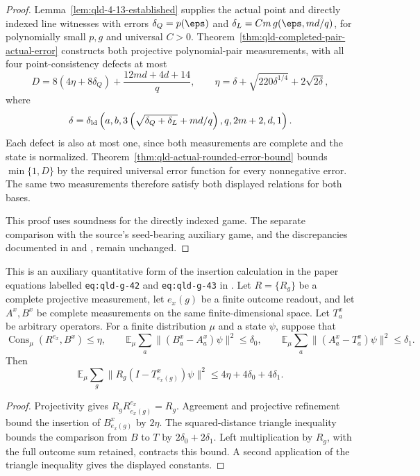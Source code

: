 \begin{proof}
\leanok
{}
Lemma~\ref{lem:qld-4-13-established} supplies the actual point and directly
indexed line witnesses with errors $\delta_Q=p(\eps)$ and
$\delta_L=Cm\,g(\eps,md/q)$, for polynomially small $p,g$ and universal $C>0$.
Theorem~\ref{thm:qld-completed-pair-actual-error} constructs both projective
polynomial-pair measurements, with all four point-consistency defects at most
\[
 D=8(4\eta+8\delta_Q)+\frac{12md+4d+14}{q},\qquad
 \eta=\delta+\sqrt{220\delta^{1/4}}+2\sqrt{2\delta},
\]
where
\[
 \delta=\delta_{\rm ld}\left(a,b,
 3\left(\sqrt{\delta_Q+\delta_L}+md/q\right),q,2m+2,d,1\right).
\]
Each defect is also at most one, since both measurements are complete and
the state is normalized. Theorem~\ref{thm:qld-actual-rounded-error-bound}
bounds $\min\{1,D\}$ by the required universal error function for every
nonnegative error. The same two measurements therefore satisfy both
displayed relations for both bases.

This proof uses soundness for the directly indexed game. The separate
comparison with the source's seed-bearing auxiliary game, and the
discrepancies documented in \cite{gap:qpbt_ld-dimension-divisibility} and
\cite{gap:qpbt_combined-lines-error-term}, remain unchanged.
\end{proof}

\begin{lemma}
\label{lem:qld-projective-refinement-ordered}
\leanok
This is an auxiliary quantitative form of the insertion calculation in the
paper equations labelled \texttt{eq:qld-g-42} and \texttt{eq:qld-g-43}
in \cite{Ji2020MIPStar}. Let $R=\{R_g\}$ be a
complete projective measurement, let $e_x(g)$ be a finite outcome readout,
and let $A^x,B^x$ be complete measurements on the same finite-dimensional
space. Let $T^x_a$ be arbitrary operators. For a finite distribution $\mu$
and a state $\psi$, suppose that
\[
 \operatorname{Cons}_\mu(R^{e_x},B^x)\leq\eta,\qquad
 \mathbb E_\mu\sum_a\|(B^x_a-A^x_a)\psi\|^2\leq\delta_0,\qquad
 \mathbb E_\mu\sum_a\|(A^x_a-T^x_a)\psi\|^2\leq\delta_1.
\]
Then
\[
 \mathbb E_\mu\sum_g\|R_g(I-T^x_{e_x(g)})\psi\|^2
 \leq 4\eta+4\delta_0+4\delta_1.
\]
\end{lemma}
\begin{proof}
\leanok
{}
Projectivity gives $R_gR^{e_x}_{e_x(g)}=R_g$. Agreement and projective
refinement bound the insertion of $B^x_{e_x(g)}$ by $2\eta$.
The squared-distance triangle inequality bounds the comparison from $B$
to $T$ by $2\delta_0+2\delta_1$. Left multiplication by $R_g$, with
the full outcome sum retained, contracts this bound. A second application
of the triangle inequality gives the displayed constants.
\end{proof}

